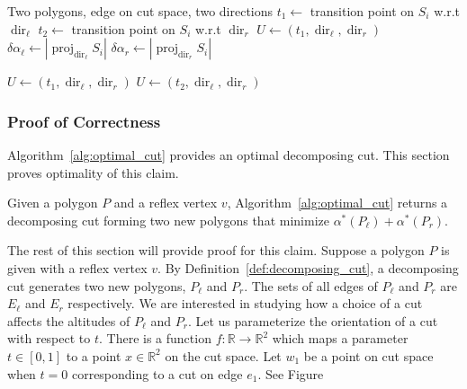 \documentclass[../main.tex]{subfiles}
\begin{document}
\begin{algorithm}
	\caption{$\operatorname{get\_cands}(P_{\ell}, P_r, S_i, \operatorname{dir}_{\ell}, \operatorname{dir}_r)$}
	\label{alg:find_candidate}
	\begin{algorithmic}[1]
		\REQUIRE Two polygons, edge on cut space, two directions
			\STATE $t_1\gets$ transition point on $S_i$ w.r.t $\operatorname{dir}_{\ell}$	\label{line:cand_trans_pt}
			\STATE $t_2\gets$ transition point on $S_i$ w.r.t $\operatorname{dir}_r$ \label{line:cand_trans_pt_2}
			\label{line:cand_if}
				\STATE $U\gets(t_1, \operatorname{dir}_{\ell}, \operatorname{dir}_r)$
			\ELSE \label{line:cand_else}
				\STATE $\delta\alpha_{\ell}\gets |\operatorname{proj}_{\operatorname{dir}_{\ell}}S_i|$
				\STATE $\delta\alpha_r\gets |\operatorname{proj}_{\operatorname{dir}_r}S_i|$

					\STATE $U\gets(t_1, \operatorname{dir}_{\ell}, \operatorname{dir}_r)$
				\ELSE
					\STATE $U\gets(t_2, \operatorname{dir}_{\ell}, \operatorname{dir}_r)$
				\ENDIF
			\ENDIF
	\end{algorithmic}
\end{algorithm}

\subsubsection{Proof of Correctness}
\label{sec:proof_of_correctness}

Algorithm~\ref{alg:optimal_cut} provides an optimal decomposing cut. This section proves optimality of this claim.

\begin{claim}
Given a polygon $P$ and a reflex vertex $v$, Algorithm~\ref{alg:optimal_cut} returns a decomposing cut forming two new polygons that minimize $\alpha^*(P_{\ell})+\alpha^*(P_r)$.
\end{claim}

The rest of this section will provide proof for this claim. Suppose a polygon $P$ is given with a reflex vertex $v$. By Definition~\ref{def:decomposing_cut}, a decomposing cut generates two new polygons, $P_{\ell}$ and $P_r$. The sets of all edges of $P_{\ell}$ and $P_r$ are $E_{\ell}$ and $E_r$ respectively. We are interested in studying how a choice of a cut affects the altitudes of $P_{\ell}$ and $P_r$. Let us parameterize the orientation of a cut with respect to $t$. There is a function $f:\mathbb{R}\to\mathbb{R}^2$ which maps a parameter $t\in[0,1]$ to a point $x\in\mathbb{R}^2$ on the cut space. Let $w_1$ be a point on cut space when $t=0$ corresponding to a cut on edge $e_1$. See Figure~%
\end{document}
